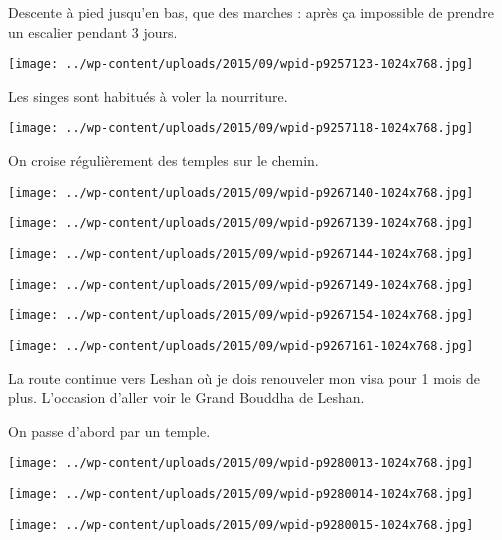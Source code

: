  Descente à pied jusqu'en bas, que des marches : après ça impossible de prendre un escalier pendant 3 jours. 
\begin{center} \texttt{[image: ../wp-content/uploads/2015/09/wpid-p9257123-1024x768.jpg]} \end{center}

\pagebreak
 Les singes sont habitués à voler la nourriture. 
\begin{center} \texttt{[image: ../wp-content/uploads/2015/09/wpid-p9257118-1024x768.jpg]} \end{center}

 On croise régulièrement des temples sur le chemin. 
\begin{center} \texttt{[image: ../wp-content/uploads/2015/09/wpid-p9267140-1024x768.jpg]} \end{center}
\begin{center} \texttt{[image: ../wp-content/uploads/2015/09/wpid-p9267139-1024x768.jpg]} \end{center}
\begin{center} \texttt{[image: ../wp-content/uploads/2015/09/wpid-p9267144-1024x768.jpg]} \end{center}
\begin{center} \texttt{[image: ../wp-content/uploads/2015/09/wpid-p9267149-1024x768.jpg]} \end{center}
\begin{center} \texttt{[image: ../wp-content/uploads/2015/09/wpid-p9267154-1024x768.jpg]} \end{center}
\begin{center} \texttt{[image: ../wp-content/uploads/2015/09/wpid-p9267161-1024x768.jpg]} \end{center}

 La route continue vers Leshan où je dois renouveler mon visa pour 1 mois de plus. L'occasion d'aller voir le Grand Bouddha de Leshan. 

 On passe d'abord par un temple. 
\begin{center} \texttt{[image: ../wp-content/uploads/2015/09/wpid-p9280013-1024x768.jpg]} \end{center}
\begin{center} \texttt{[image: ../wp-content/uploads/2015/09/wpid-p9280014-1024x768.jpg]} \end{center}
\begin{center} \texttt{[image: ../wp-content/uploads/2015/09/wpid-p9280015-1024x768.jpg]} \end{center}

